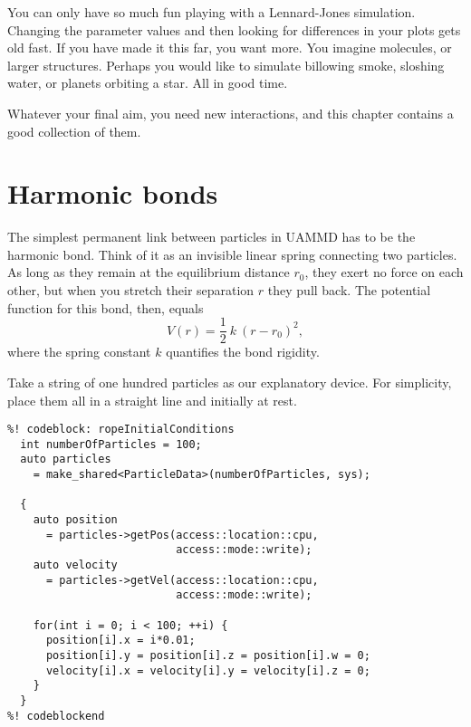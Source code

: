 
You can only have so much fun playing with a Lennard-Jones simulation. Changing
the parameter values and then looking for differences in your plots gets old
fast. If you have made it this far, you want more. You imagine molecules, or
larger structures. Perhaps you would like to simulate billowing smoke, sloshing
water, or planets orbiting a star. All in good time.

Whatever your final aim, you need new interactions, and this chapter contains a
good collection of them.

\section{Harmonic bonds}

The simplest permanent link between particles in UAMMD has to be the harmonic
bond. Think of it as an invisible linear spring connecting two particles. As
long as they remain at the equilibrium distance $r_0$, they exert no force on
each other, but when you stretch their separation $r$ they pull back. The
potential function for this bond, then, equals
\begin{equation*}
  V(r) = \frac{1}{2}\ k\ (r - r_0)^2,
\end{equation*}
where the spring constant $k$ quantifies the bond rigidity.

Take a string of one hundred particles as our explanatory device. For
simplicity, place them all in a straight line and initially at rest.
\begin{lstlisting}
%! codeblock: ropeInitialConditions
  int numberOfParticles = 100;
  auto particles
    = make_shared<ParticleData>(numberOfParticles, sys);

  {
    auto position
      = particles->getPos(access::location::cpu,
                          access::mode::write);
    auto velocity
      = particles->getVel(access::location::cpu,
                          access::mode::write);

    for(int i = 0; i < 100; ++i) {
      position[i].x = i*0.01;
      position[i].y = position[i].z = position[i].w = 0;
      velocity[i].x = velocity[i].y = velocity[i].z = 0;
    }
  }
%! codeblockend
\end{lstlisting}

